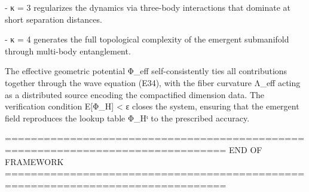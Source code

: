     - κ = 3 regularizes the dynamics via three-body interactions that
      dominate at short separation distances.

    - κ = 4 generates the full topological complexity of the emergent
      submanifold through multi-body entanglement.

The effective geometric potential Φ_eff self-consistently ties all
contributions together through the wave equation (E34), with the fiber
curvature Λ_eff acting as a distributed source encoding the compactified
dimension data. The verification condition E[Φ_H] < ε closes the system,
ensuring that the emergent field reproduces the lookup table Φ_Hᵗ to
the prescribed accuracy.

================================================================================
                              END OF FRAMEWORK
================================================================================
